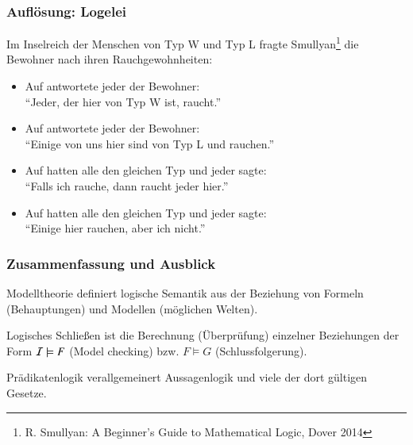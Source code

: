\documentclass[aspectratio=1610,onlymath]{beamer}
\begin{document}
\begin{frame}\frametitle{Auflösung: Logelei}

Im Inselreich der Menschen von Typ W und Typ L fragte 
Smullyan\footnote{R. Smullyan: A Beginner's Guide to Mathematical Logic, Dover 2014} die Bewohner nach ihren Rauchgewohnheiten:

\begin{itemize}
\item Auf  antwortete jeder der Bewohner:\\ \alert{"`Jeder, der hier von Typ W ist, raucht."'}\\
%
\item Auf  antwortete jeder der Bewohner:\\ \alert{"`Einige von uns hier sind von Typ L und rauchen."'}\\
%
\item Auf  hatten alle den gleichen Typ und jeder sagte:\\ \alert{"`Falls ich rauche, dann raucht jeder hier."'}\\
%
\item Auf  hatten alle den gleichen Typ und jeder sagte:\\ \alert{"`Einige hier rauchen, aber ich nicht."'}\\
%
\end{itemize}

\end{frame}

\begin{frame}\frametitle{Zusammenfassung und Ausblick}

Modelltheorie definiert logische Semantik aus der Beziehung von Formeln (Behauptungen) und Modellen (möglichen Welten).
\bigskip


Logisches Schließen ist die Berechnung (Überprüfung) einzelner Beziehungen der Form $\mathcal{I}\models F$ (Model checking) bzw. $F\models G$ (Schlussfolgerung).\bigskip

Prädikatenlogik verallgemeinert Aussagenlogik und viele der dort gültigen Gesetze.
\bigskip


\end{frame}
\end{document}
